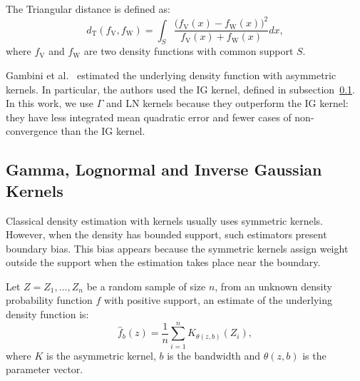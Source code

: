 \documentclass[twocolumn]{svjour3}
\begin{document}
	The Triangular distance is defined as:
	\begin{equation}
		d_{\text{{T}}}(f_{\text{{V}}},f_{\text{{W}}})=\int_{S}\frac{\big(f_{\text{{V}}}(x)-f_{\text{{W}}}(x)\big)^2}{f_{\text{{V}}}(x)+f_{\text{{W}}}(x)}dx,
		\label{DT}
	\end{equation}
	where $f_{\text{{V}}}$ and $f_{\text{{W}}}$ are two density functions with common support $S$.
	
	Gambini et al.~\cite{gambini2015} estimated the underlying density function with asymmetric kernels.
	In particular, the authors used the IG kernel, defined in subsection~\ref{asymmetrickernel}. 
	In this work, we use $\Gamma$ and LN kernels because they outperform the IG kernel: they have less integrated mean quadratic error and fewer cases of non-convergence than the IG kernel.
	
	\subsection{Gamma, Lognormal and Inverse Gaussian Kernels}
	\label{asymmetrickernel}
	
	Classical density estimation with kernels usually uses symmetric kernels. 
	However, when the density has bounded support, such estimators present boundary bias. 
	This bias appears because the symmetric kernels assign weight outside the support when the estimation takes place near the boundary.
	
	
	Let $ Z = Z_1,\dots, Z_n$ be a random sample of size $n$, from an unknown density probability function $f$ with positive support, an estimate of the underlying density function is:
	$$
	\widehat{f}_b(z)=\frac{1}{n}\sum_{i=1}^n K_{\theta(z,b)}(Z_i),
	$$ 
	where $K$ is the asymmetric kernel, $b$ is the bandwidth and ${\theta}(z,b)$ is the parameter vector.
	
\end{document}
